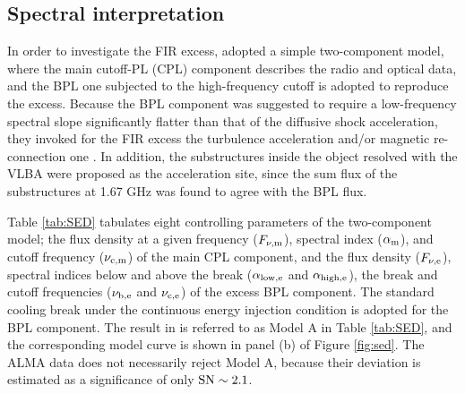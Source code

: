 \documentclass[twocolumn]{aastex631}
\begin{document}
\subsection{Spectral interpretation}
\label{sec:SED}
In order to investigate the FIR excess, 
\citet{isobe2020} adopted a simple two-component model,
where the main cutoff-PL (CPL) component describes the radio and optical data, 
and the BPL one subjected to the high-frequency cutoff 
is adopted to reproduce the excess. 
Because the BPL component was suggested to require 
a low-frequency spectral slope significantly flatter than 
that of the diffusive shock acceleration,
they invoked for the FIR excess 
the turbulence acceleration \citep[e.g.,][]{asano2014} 
and/or magnetic re-connection one \citep[e.g.,][]{sironi2014}.
In addition, the substructures inside the object
resolved with the VLBA \citep{tingay2008} 
were proposed as the acceleration site, 
since the sum flux of the substructures at 1.67 GHz
was found to agree with the BPL flux. 

Table \ref{tab:SED} tabulates 
eight controlling parameters of the two-component model;
the flux density at a given frequency ($F_{\nu, {\rm m}}$),
spectral index ($\alpha_{\rm m}$), 
and cutoff frequency ($\nu_{\rm c,m}$)
of the main CPL component,
and the flux density ($F_{\nu,{\rm e}}$), 
spectral indices below and above the break 
($\alpha_{\rm low,e}$ and $\alpha_{\rm high,e}$),
the break and cutoff frequencies 
($\nu_{\rm b,e}$ and $\nu_{\rm c,e}$)
of the excess BPL component.
The standard cooling break under the continuous energy injection condition
\citep[$\Delta \alpha = \alpha_{\rm high,e} - \alpha_{\rm low,e} =0.5$;]
[]{carilli1991} is adopted for the BPL component.
The result in \citet{isobe2020} is referred to 
as Model A in Table \ref{tab:SED},
and the corresponding model curve 
is shown in panel (b) of Figure \ref{fig:sed}.
The ALMA data does not necessarily reject Model A,
because their deviation is estimated 
as a significance of only ${\rm SN}\sim 2.1$.
\end{document}
